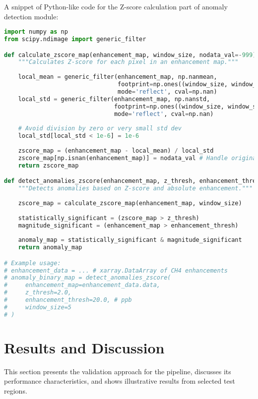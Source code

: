 \documentclass[12pt,a4paper]{article}
\begin{document}
A snippet of Python-like code for the Z-score calculation part of anomaly detection module:
\begin{lstlisting}[language=Python, caption=Conceptual Python snippet for Z-score based anomaly detection, label=lst:py_zscore]
import numpy as np
from scipy.ndimage import generic_filter

def calculate_zscore_map(enhancement_map, window_size, nodata_val=-999):
    """Calculates Z-score for each pixel in an enhancement map."""
    
    local_mean = generic_filter(enhancement_map, np.nanmean,
                                footprint=np.ones((window_size, window_size)),
                                mode='reflect', cval=np.nan)
    local_std = generic_filter(enhancement_map, np.nanstd,
                               footprint=np.ones((window_size, window_size)),
                               mode='reflect', cval=np.nan)
    
    # Avoid division by zero or very small std dev
    local_std[local_std < 1e-6] = 1e-6 
    
    zscore_map = (enhancement_map - local_mean) / local_std
    zscore_map[np.isnan(enhancement_map)] = nodata_val # Handle original NaNs
    return zscore_map

def detect_anomalies_zscore(enhancement_map, z_thresh, enhancement_thresh, window_size):
    """Detects anomalies based on Z-score and absolute enhancement."""
    
    zscore_map = calculate_zscore_map(enhancement_map, window_size)
    
    statistically_significant = (zscore_map > z_thresh)
    magnitude_significant = (enhancement_map > enhancement_thresh)
    
    anomaly_map = statistically_significant & magnitude_significant
    return anomaly_map

# Example usage:
# enhancement_data = ... # xarray.DataArray of CH4 enhancements
# anomaly_binary_map = detect_anomalies_zscore(
#     enhancement_map=enhancement_data.data, 
#     z_thresh=2.0, 
#     enhancement_thresh=20.0, # ppb
#     window_size=5
# )
\end{lstlisting}

\section{Results and Discussion}
\label{sec:results_discussion}
This section presents the validation approach for the pipeline, discusses its performance characteristics, and shows illustrative results from selected test regions.
\end{document}
